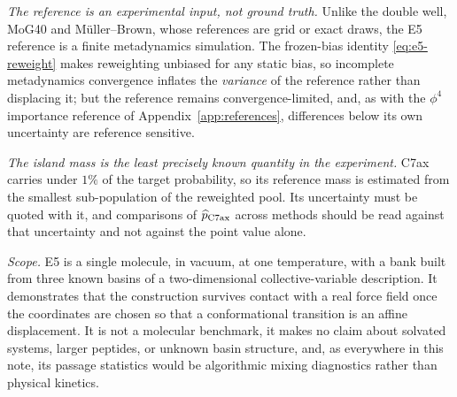 \documentclass[11pt]{article}
\begin{document}
\emph{The reference is an experimental input, not ground truth.}  Unlike the
double well, MoG40 and M\"uller--Brown, whose references are grid or exact
draws, the E5 reference is a finite metadynamics simulation.  The frozen-bias
identity \eqref{eq:e5-reweight} makes reweighting unbiased for any static bias,
so incomplete metadynamics convergence inflates the \emph{variance} of the
reference rather than displacing it; but the reference remains
convergence-limited, and, as with the $\phi^4$ importance reference of
Appendix~\ref{app:references}, differences below its own uncertainty are
reference sensitive.

\emph{The island mass is the least precisely known quantity in the
experiment.}  C7ax carries under $1\%$ of the target probability, so its
reference mass is estimated from the smallest sub-population of the reweighted
pool.  Its uncertainty must be quoted with it, and comparisons of
$\widehat p_{\rm C7ax}$ across methods should be read against that uncertainty
and not against the point value alone.

\emph{Scope.}  E5 is a single molecule, in vacuum, at one temperature, with a
bank built from three known basins of a two-dimensional collective-variable
description.  It demonstrates that the construction survives contact with a
real force field once the coordinates are chosen so that a conformational
transition is an affine displacement.  It is not a molecular benchmark, it
makes no claim about solvated systems, larger peptides, or unknown basin
structure, and, as everywhere in this note, its passage statistics would be
algorithmic mixing diagnostics rather than physical kinetics.
\end{document}
